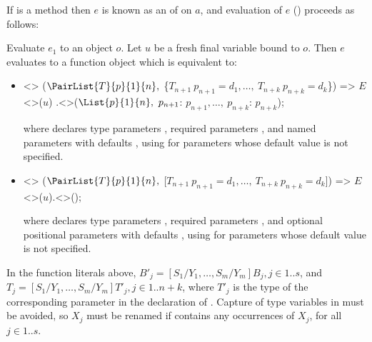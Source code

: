 \documentclass[makeidx]{article}
\begin{document}

\LMHash{}%
If \id{} is a method then $e$ is known as an
of \id{} on $a$,
and evaluation of $e$
()
proceeds as follows:

\LMHash{}%
Evaluate $e_1$ to an object $o$.
Let $u$ be a fresh final variable bound to $o$.
Then $e$ evaluates to a function object which is equivalent to:
\begin{itemize}
\item
\begin{normativeDartCode}
<>
($\PairList{T}{p}{1}{n},\ $\{$T_{n+1}\ p_{n+1} = d_1, \ldots,\ T_{n+k}\ p_{n+k} = d_k$\}) =>
\quad$E$<>($u$)
\quad.\id<>($\List{p}{1}{n},\ p_{n+1}$: $p_{n+1}, \ldots,\ p_{n+k}$: $p_{n+k}$);
\end{normativeDartCode}
where \id{} declares type parameters
\TypeParametersStd,
required parameters ,
and named parameters  with defaults ,
using  for parameters whose default value is not specified.
\item
\begin{normativeDartCode}
<>
($\PairList{T}{p}{1}{n},\ $[$T_{n+1}\ p_{n+1} = d_1, \ldots,\ T_{n+k}\ p_{n+k} = d_k$]) =>
\quad$E$<>($u$).\id<>();
\end{normativeDartCode}
where \id{} declares type parameters
\TypeParametersStd,
required parameters ,
and optional positional parameters
 with defaults ,
using  for parameters whose default value is not specified.
\end{itemize}

\LMHash{}%
In the function literals above,
$B'_j = [S_1/Y_1, \ldots, S_m/Y_m]B_j, j \in 1 .. s$,
and $T_j = [S_1/Y_1, \ldots, S_m/Y_m]T'_j, j \in 1 .. n+k$,
where $T'_j$ is the type of the corresponding parameter in
the declaration of \id.
Capture of type variables in  must be avoided,
so $X_j$ must be renamed if  contains any occurrences of $X_j$,
for all $j \in 1 .. s$.

\end{document}
